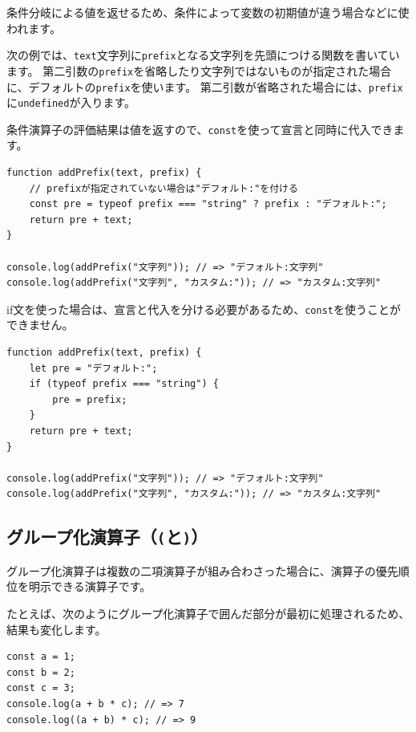 条件分岐による値を返せるため、条件によって変数の初期値が違う場合などに使われます。

次の例では、\texttt{text}文字列に\texttt{prefix}となる文字列を先頭につける関数を書いています。
第二引数の\texttt{prefix}を省略したり文字列ではないものが指定された場合に、デフォルトの\texttt{prefix}を使います。
第二引数が省略された場合には、\texttt{prefix}に\texttt{undefined}が入ります。

条件演算子の評価結果は値を返すので、\texttt{const}を使って宣言と同時に代入できます。

\begin{lstlisting}
function addPrefix(text, prefix) {
    // prefixが指定されていない場合は"デフォルト:"を付ける
    const pre = typeof prefix === "string" ? prefix : "デフォルト:";
    return pre + text;
}

console.log(addPrefix("文字列")); // => "デフォルト:文字列"
console.log(addPrefix("文字列", "カスタム:")); // => "カスタム:文字列"
\end{lstlisting}

if文を使った場合は、宣言と代入を分ける必要があるため、\texttt{const}を使うことができません。

\enlargethispage{\baselineskip}\begin{lstlisting}
function addPrefix(text, prefix) {
    let pre = "デフォルト:";
    if (typeof prefix === "string") {
        pre = prefix;
    }
    return pre + text;
}

console.log(addPrefix("文字列")); // => "デフォルト:文字列"
console.log(addPrefix("文字列", "カスタム:")); // => "カスタム:文字列"
\end{lstlisting}


\hypertarget{group-operator}{%
\subsection{\texorpdfstring{グループ化演算子（\texttt{(}と\texttt{)}）}{グループ化演算子（(と)）}}\label{group-operator}}

グループ化演算子は複数の二項演算子が組み合わさった場合に、演算子の優先順位を明示できる演算子です。

たとえば、次のようにグループ化演算子で囲んだ部分が最初に処理されるため、結果も変化します。

\begin{lstlisting}
const a = 1;
const b = 2;
const c = 3;
console.log(a + b * c); // => 7
console.log((a + b) * c); // => 9
\end{lstlisting}

